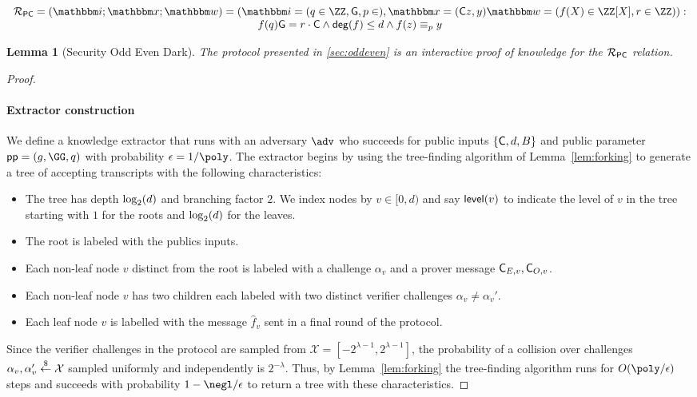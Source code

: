 \documentclass{article}
\theoremstyle{Definition}
\newtheorem{lemma}{Lemma}
\begin{document}
\begin{equation*}
		\begin{array}{c}
	\Relation_\PC=(\NPIndex;\NPInstance;\NPWitness)= (\NPIndex=(q \in \ZZ,\Generator ,p\in  ) ,\NPInstance=( \Commitment z,y) \NPWitness=( f(X) \in \ZZ[X], r  \in \ZZ)):\\
		f(q) \Generator = r \cdot \Commitment \wedge \degree(f)\leq d \wedge f(z) \equiv_p y
	\end{array}
 \end{equation*}

\begin{lemma}[Security Odd Even Dark]
	The protocol presented in \cref{sec:oddeven} is an interactive proof of knowledge for the $\mathcal{R}_{\mathsf{PC}}$ relation.
\end{lemma}
\begin{proof}

~\paragraph{Extractor construction}
		We define a knowledge extractor that runs with an adversary $\adv$ who succeeds for public inputs $\{\mathsf{C},d,B \}$ and public parameter $\crs=(g,\GG,q)$ with probability $\epsilon = 1/\poly$. The extractor begins by using the tree-finding algorithm of Lemma~\ref{lem:forking} to generate a tree of accepting transcripts with the following characteristics: 
\begin{itemize}
\item The tree has depth $\log_2(d)$ and branching factor $2$. We index nodes by $v \in [0, d)$ and say $\textsf{level}(v)$ to indicate the level of $v$ in the tree starting with $1$ for the roots and $\log_2(d)$ for the leaves.
\item The root is labeled with the publics inputs. 
\item Each non-leaf node $v$ distinct from the root is labeled with a challenge $\alpha_{v}$ and a prover message $\mathsf{C}_{E,v},\mathsf{C}_{O,v}$.
\item Each non-leaf node $v$ has two children each labeled with two distinct verifier challenges 
$\alpha_{v} \neq \alpha_{v}'$.
\item Each leaf node $v$ is labelled with the message $\hat{f}_v$ sent in a final round of the protocol. 
\end{itemize} 

Since the verifier challenges in the protocol are sampled from $\mathcal{X} = [-2^{\lambda -1}, 2^{\lambda -1}]$, the probability of a collision over challenges $\alpha_v, \alpha_v' \overset{\$}{\gets} \mathcal{X}$ sampled uniformly and independently is $2^{-\lambda}$. Thus, by Lemma~\ref{lem:forking} the tree-finding algorithm runs for $O(\poly/\epsilon)$ steps and succeeds with probability $1 - \negl/\epsilon$ to return a tree with these characteristics.


\end{proof}
\end{document}
